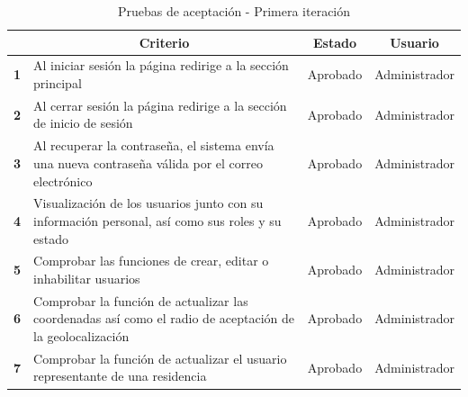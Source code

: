 \begin{footnotesize}

\begin{spacing}{1}
    \begin{center}
    \renewcommand*{\arraystretch}{1.4}
    \begin{longtable}{ |>{\bfseries}l|p{}|l|l| }
        \caption{Pruebas de aceptación - Primera iteración}\\
        \hline
        \multicolumn{1}{|c|}{ \textbf{N.}} & \multicolumn{1}{c|}{\textbf{Criterio}} & \multicolumn{1}{c|}{ \textbf{Estado}} & \multicolumn{1}{c|}{ \textbf{Usuario}}\\
        \hline
        1 & Al iniciar sesión la página redirige a la sección principal & Aprobado & Administrador\\
        \hline
        2 & Al cerrar sesión la página redirige a la sección de inicio de sesión & Aprobado & Administrador\\
        \hline
        3 & Al recuperar la contraseña, el sistema envía una nueva contraseña válida por el correo electrónico & Aprobado & Administrador\\
        \hline
        4 & Visualización de los usuarios junto con su información personal, así como sus roles y su estado & Aprobado & Administrador\\
        \hline
        5 & Comprobar las funciones de crear, editar o inhabilitar usuarios & Aprobado & Administrador\\
        \hline
        6 & Comprobar la función de actualizar las coordenadas así como el radio de aceptación de la geolocalización & Aprobado & Administrador\\
        \hline
        7 & Comprobar la función de actualizar el usuario representante de una residencia & Aprobado & Administrador\\
        \hline
    \end{longtable}\label{tab:pruebas-aceptacion-1}
    \end{center}
\end{spacing}
\end{footnotesize}

